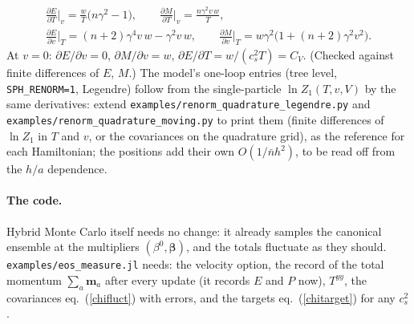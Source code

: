 \documentclass[11pt,aps,preprint,nofootinbib,superscriptaddress,tightenlines]{revtex4-2}
\def\st{\begin{equation}}
\def\stp{\end{equation}}
\def\Eq#1{eq.~(\ref{#1})}
\let\oldparagraph\paragraph
\renewcommand{\paragraph}{\par\bigskip\oldparagraph}
\begin{document}
\st
\begin{gathered}
\frac{\partial E}{\partial T}\Big|_v=\frac wT\big(n\gamma^2-1\big),\qquad \frac{\partial M}{\partial T}\Big|_v=\frac{n\gamma^2v\,w}{T},\\
\frac{\partial E}{\partial v}\Big|_T=(n+2)\gamma^4v\,w-\gamma^2v\,w,\qquad \frac{\partial M}{\partial v}\Big|_T=w\gamma^2\big(1+(n+2)\gamma^2v^2\big) .
\end{gathered}
\label{chitarget}
\stp
At $v=0$: $\partial E/\partial v=0$, $\partial M/\partial v=w$, $\partial E/\partial T=w/(c_s^2T)=C_V$.  (Checked against finite differences of $E$, $M$.)  The model's one-loop entries (tree level, \texttt{SPH\_RENORM=1},
Legendre) follow from the single-particle $\ln Z_1(T,v,V)$ by the same derivatives: extend \nolinkurl{examples/renorm_quadrature_legendre.py} and
\nolinkurl{examples/renorm_quadrature_moving.py} to print them (finite differences of $\ln Z_1$ in $T$ and $v$, or the covariances on the quadrature grid), as the
reference for each Hamiltonian; the positions add their own $O(1/\bar nh^2)$, to be read off from the $h/a$ dependence.

\paragraph{The code.}  Hybrid Monte Carlo itself needs no change: it already samples the canonical ensemble at the multipliers $(\beta^0,\bm\beta)$, and the totals
fluctuate as they should.  \nolinkurl{examples/eos_measure.jl} needs: the velocity option, the record of the total momentum $\sum_a\bm m_a$ after every update
(it records $E$ and $P$ now), $T^{yy}$, the covariances \Eq{chifluct} with errors, and the targets \Eq{chitarget} for any $c_s^2$.
\end{document}
